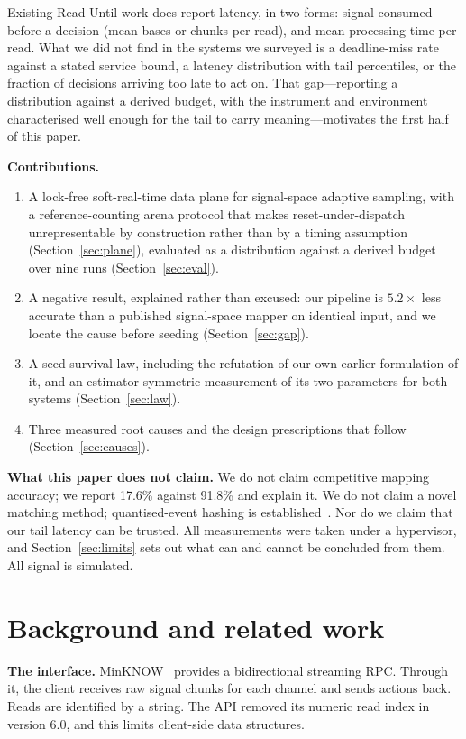\documentclass[conference]{IEEEtran}
\begin{document}
Existing Read Until work does report latency, in two forms: signal consumed before a decision
(mean bases or chunks per read), and mean processing time per read. What we did not find in the
systems we surveyed is a deadline-miss rate against a stated service bound, a latency
distribution with tail percentiles, or the fraction of decisions arriving too late to act on.
That gap---reporting a distribution against a derived budget, with the instrument and
environment characterised well enough for the tail to carry meaning---motivates the first half
of this paper.

\textbf{Contributions.}
\begin{enumerate}
\item A lock-free soft-real-time data plane for signal-space adaptive sampling, with a
reference-counting arena protocol that makes reset-under-dispatch unrepresentable by
construction rather than by a timing assumption (Section~\ref{sec:plane}), evaluated as a
distribution against a derived budget over nine runs (Section~\ref{sec:eval}).
\item A negative result, explained rather than excused: our pipeline is $5.2\times$ less accurate
than a published signal-space mapper on identical input, and we locate the cause before
seeding (Section~\ref{sec:gap}).
\item A seed-survival law, including the refutation of our own earlier formulation of it, and
an estimator-symmetric measurement of its two parameters for both systems
(Section~\ref{sec:law}).
\item Three measured root causes and the design prescriptions that follow
(Section~\ref{sec:causes}).
\end{enumerate}

\textbf{What this paper does not claim.} We do not claim competitive mapping accuracy; we
report 17.6\% against 91.8\% and explain it. We do not claim a novel matching method;
quantised-event hashing is established~\cite{rawhash,rawhash2}. Nor do we claim that our tail
latency can be trusted. All measurements were taken under a hypervisor, and
Section~\ref{sec:limits} sets out what can and cannot be concluded from them. All signal is
simulated.

\section{Background and related work}

\textbf{The interface.} MinKNOW~\cite{minknow} provides a bidirectional streaming RPC. Through
it, the client receives raw signal chunks for each channel and sends actions back. Reads are
identified by a string. The API removed its numeric read index in version 6.0, and this limits
client-side data structures.
\end{document}
